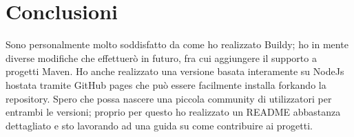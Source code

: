 \documentclass{report}
\begin{document}
\section{Conclusioni}
Sono personalmente molto soddisfatto da come ho realizzato Buildy; ho in mente diverse modifiche che effettuerò in futuro, fra cui aggiungere il supporto a progetti Maven. Ho anche realizzato una versione basata interamente su NodeJs hostata tramite GitHub pages che può essere facilmente installa forkando la repository.
Spero che possa nascere una piccola community di utilizzatori per entrambi le versioni; proprio per questo ho realizzato un README abbastanza dettagliato e sto lavorando ad una guida su come contribuire ai progetti.
\end{document}
